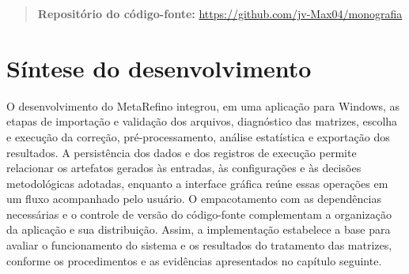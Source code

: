 \begin{quote}
    \textbf{Repositório do código-fonte:} \url{https://github.com/jv-Max04/monografia}
\end{quote}

\section{Síntese do desenvolvimento}

O desenvolvimento do MetaRefino integrou, em uma aplicação para Windows, as etapas de importação e validação dos arquivos, diagnóstico das matrizes, escolha e execução da correção, pré-processamento, análise estatística e exportação dos resultados. A persistência dos dados e dos registros de execução permite relacionar os artefatos gerados às entradas, às configurações e às decisões metodológicas adotadas, enquanto a interface gráfica reúne essas operações em um fluxo acompanhado pelo usuário. O empacotamento com as dependências necessárias e o controle de versão do código-fonte complementam a organização da aplicação e sua distribuição. Assim, a implementação estabelece a base para avaliar o funcionamento do sistema e os resultados do tratamento das matrizes, conforme os procedimentos e as evidências apresentados no capítulo seguinte.
